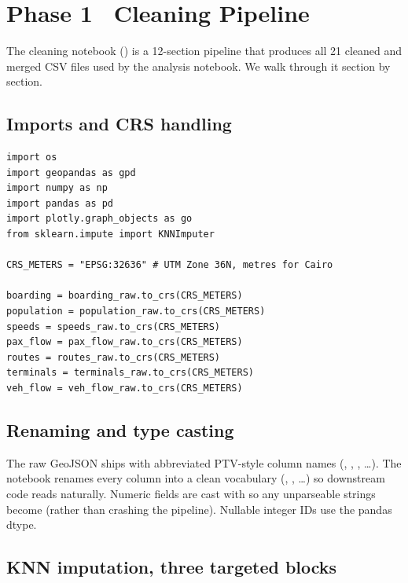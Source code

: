 
\section{Phase 1 \textbullet\ Cleaning Pipeline}
\label{sec:phase1-cleaning}

The cleaning notebook () is a 12-section pipeline
that produces all 21 cleaned and merged CSV files used by the analysis
notebook. We walk through it section by section.

\subsection{Imports and CRS handling}

\begin{lstlisting}[caption={Cleaning notebook imports and CRS reprojection.}]
import os
import geopandas as gpd
import numpy as np
import pandas as pd
import plotly.graph_objects as go
from sklearn.impute import KNNImputer

CRS_METERS = "EPSG:32636" # UTM Zone 36N, metres for Cairo

boarding = boarding_raw.to_crs(CRS_METERS)
population = population_raw.to_crs(CRS_METERS)
speeds = speeds_raw.to_crs(CRS_METERS)
pax_flow = pax_flow_raw.to_crs(CRS_METERS)
routes = routes_raw.to_crs(CRS_METERS)
terminals = terminals_raw.to_crs(CRS_METERS)
veh_flow = veh_flow_raw.to_crs(CRS_METERS)
\end{lstlisting}

\subsection{Renaming and type casting}

The raw GeoJSON ships with abbreviated PTV-style column names
(, , , \ldots). The
notebook renames every column into a clean vocabulary
(, , \ldots) so downstream code reads
naturally. Numeric fields are cast with  so any unparseable strings become  (rather
than crashing the pipeline). Nullable integer IDs use the pandas
 dtype.

\subsection{KNN imputation, three targeted blocks}

